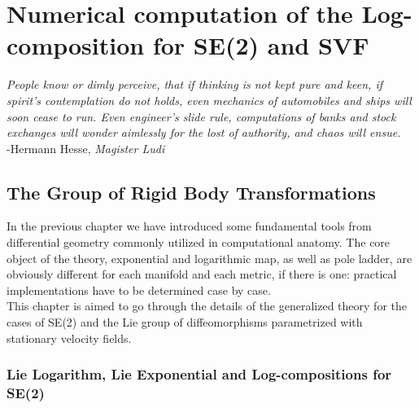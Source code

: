 \chapter{Numerical computation of the Log-composition for SE(2) and SVF}\label{ch:spatial_transformations}

\begin{flushright}
	\emph{People know or dimly perceive, that if thinking is not kept pure and keen, if spirit's contemplation do not holds, even mechanics of automobiles and ships will soon cease to run. Even engineer's slide rule, computations of banks and stock exchanges will wonder aimlessly for the lost of authority, and chaos will ensue.} \\ -Hermann Hesse, \emph{Magister Ludi}
\end{flushright}

\section{The Group of Rigid Body Transformations}\label{ch:rigid_body_transformations}

In the previous chapter we have introduced some fundamental tools from differential geometry commonly utilized in computational anatomy. The core object of the theory, exponential and logarithmic map, as well as pole ladder, are obviously different for each manifold and each metric, if there is one: practical implementations have to be determined case by case.\\
This chapter is aimed to go through the details of the generalized theory for the cases of SE(2) and the Lie group of diffeomorphisms parametrized with stationary velocity fields.


\subsection{Lie Logarithm, Lie Exponential and Log-compositions for SE(2)}


